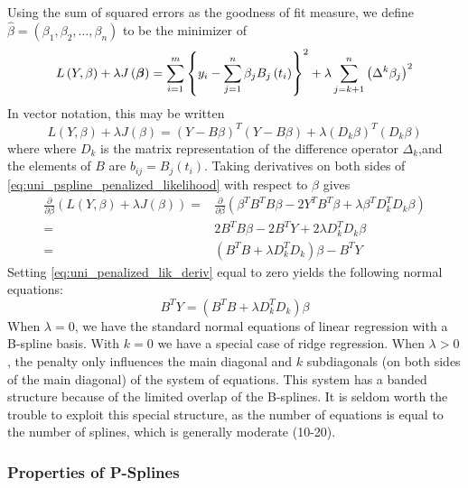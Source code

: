 \documentclass[12pt]{article}
\newcommand*\outlineskeleton{\color{green}}
\newcommand{\bfbeta}{\mbox{\boldmath $\beta$}}
\begin{document}
Using the sum of squared errors as the goodness of fit measure, we define $\hat{\beta} = \left(\beta_1, \beta_2, \dots, \beta_n \right)$ to be the minimizer of
\begin{equation*}  
L\left(Y, \beta \right) + \lambda J\left(\bfbeta\right) = \sum_{i=1}^m \left\{ y_i - \sum_{j=1}^n \beta_j B_j\left(t_i\right) \right\}^2 + \lambda \sum_{j=k+1}^n \left( \Delta^k\beta_j \right)^2
\end{equation*}
\noindent
In vector notation, this may be written
\begin{equation}\label{eq:uni_pspline_penalized_likelihood}
L\left(Y, \beta \right) + \lambda J\left(\beta\right) = \left( Y- B\beta  \right)^T \left( Y-B \beta\right) + \lambda \left(D_k \beta\right)^T\left(D_k \beta\right)
\end{equation}
\noindent
where where $D_k$ is the matrix representation of the difference operator $\Delta_k$,and the elements of $B$ are $b_{ij} = B_j\left(t_i\right)$. Taking derivatives on both sides of \ref{eq:uni_pspline_penalized_likelihood} with respect to $\beta$ gives
\begin{align}
\frac{\partial}{\partial \beta}\left(L\left(Y, \beta \right) + \lambda J\left(\beta\right) \right) ={} & \frac{\partial}{\partial \beta}\left(\beta^TB^TB \beta -2Y^T B^T\beta+\lambda \beta^T D_k^T D_k \beta  \right) \nonumber \\
= {} & 2B^TB \beta - 2B^T Y + 2\lambda D_k^TD_k\beta \nonumber\\
= {} & \left(B^T B +  \lambda D_k^TD_k\right)\beta - B^T Y \label{eq:uni_penalized_lik_deriv}
\end{align} 
\noindent
Setting \ref{eq:uni_penalized_lik_deriv} equal to zero yields the following normal equations:
\begin{equation}\label{eq:uni_pspline_normal_eq}
B^T Y = \left(B^T B +  \lambda D_k^TD_k\right)\beta
\end{equation}
When $\lambda = 0$, we have the standard normal equations of linear regression with a B-spline basis. With $k = 0$ we have a special case of ridge regression. When $\lambda > 0$, the penalty only influences the main diagonal and $k$ subdiagonals (on both sides of the main diagonal) of the system of equations. This system has a banded structure because of the limited overlap of the B-splines. It is seldom worth the trouble to exploit this special structure, as the number of equations is equal to the number of splines, which is generally moderate (10-20). 


\subsubsection{{\outlineskeleton Properties of P-Splines}}
\end{document}
